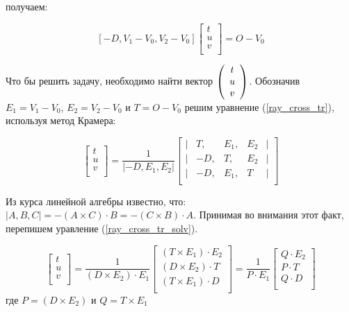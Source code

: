 \noindent получаем:

\begin{equation}
\label{ray_cross_tr}
\left[ -D, V_1 - V_0 , V_2 - V_0\right] 
\left[  
\begin{array}{c} t \\ u \\ v \\ \end{array}
\right] = O - V_0
\end{equation}

Что бы решить задачу, необходимо найти вектор $\left( \begin{array}{c} t \\ u \\ v \end{array} \right)$. Обозначив $E_1 = V_1 - V_0$, $E_2 = V_2 - V_0$ и $T = O - V_0$ решим уравнение (\ref{ray_cross_tr}), используя метод Крамера:

\begin{equation}
\label{ray_cross_tr_solv}
\left[  
\begin{array}{c} t \\ u \\ v \\ \end{array}
\right] = 
\frac{1}{| -D , E_1, E_2|} 
\left[  
	\begin{array}{lcccl}
	|& T , & E_1, &E_2 & | \\
	|&-D , & T  , &E_2 & | \\
	|&-D , & E_1, &T   & | \\
	\end{array}
\right] 
\end{equation}

\noindent Из курса линейной алгебры известно, что: $|A, B, C| = - (A \times C) \cdot B = - (C \times B) \cdot A$. Принимая во внимания этот факт, перепишем уравление (\ref{ray_cross_tr_solv}).

\begin{equation}
\label{ray_cross_tr_solv2}
\left[  
\begin{array}{c} t \\ u \\ v \\ \end{array}
\right] = 
\frac{1}{(D \times E_2)\cdot E_1} 
\left[  
	\begin{array}{c}
	(T \times E_1) \cdot E_2 \\
	(D \times E_2) \cdot T \\
	(T \times E_1) \cdot D \\
	\end{array}
\right] = 
\frac{1}{P \cdot E_1} 
\left[  
	\begin{array}{c}
	Q \cdot E_2 \\
	P \cdot T \\	
	Q \cdot D \\	
	\end{array}
\right]
\end{equation}
где $P = (D \times E_2)$ и $Q = T \times E_1$



